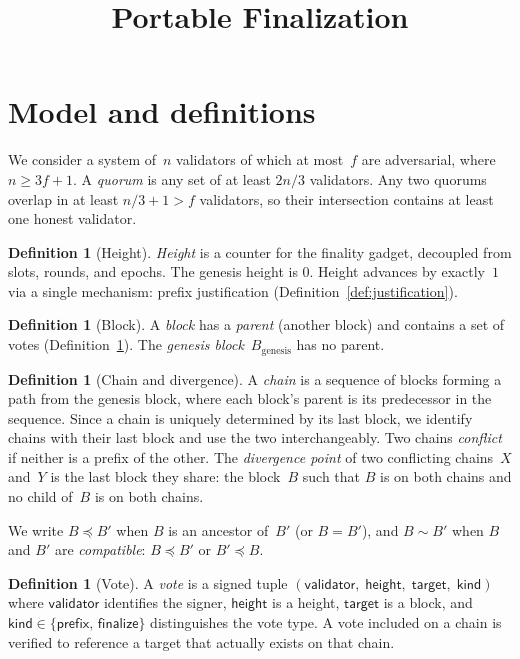 \documentclass{article}
\title{Portable Finalization}
\newcommand{\target}{\mathsf{target}}
\newcommand{\kind}{\mathsf{kind}}
\newcommand{\height}{\mathsf{height}}
\newcommand{\finalize}{\mathsf{finalize}}
\newcommand{\validator}{\mathsf{validator}}
\newcommand{\prefix}{\mathsf{prefix}}
\theoremstyle{plain}
\theoremstyle{definition}
\newtheorem{definition}[theorem]{Definition}
\theoremstyle{remark}
\begin{document}
\maketitle

\section{Model and definitions}

We consider a system of~$n$ validators of which at most~$f$ are adversarial, where $n \geq 3f + 1$.
A \emph{quorum} is any set of at least $2n/3$ validators.
Any two quorums overlap in at least $n/3 + 1 > f$ validators, so their intersection contains at least one honest validator.

\begin{definition}[Height]\label{def:height}
\emph{Height} is a counter for the finality gadget, decoupled from slots, rounds, and epochs.
The genesis height is $0$.
Height advances by exactly~$1$ via a single mechanism: prefix justification (Definition~\ref{def:justification}).
\end{definition}

\begin{definition}[Block]\label{def:block}
A \emph{block} has a \emph{parent} (another block) and contains a set of votes (Definition~\ref{def:vote}).
The \emph{genesis block}~$B_{\mathrm{genesis}}$ has no parent.
\end{definition}

\begin{definition}[Chain and divergence]\label{def:chain}
A \emph{chain} is a sequence of blocks forming a path from the genesis block, where each block's parent is its predecessor in the sequence.
Since a chain is uniquely determined by its last block, we identify chains with their last block and use the two interchangeably.
Two chains \emph{conflict} if neither is a prefix of the other.
The \emph{divergence point} of two conflicting chains~$X$ and~$Y$ is the last block they share: the block~$B$ such that $B$ is on both chains and no child of~$B$ is on both chains.
\end{definition}

We write $B \preceq B'$ when $B$ is an ancestor of~$B'$ (or $B = B'$), and $B \sim B'$ when $B$ and $B'$ are \emph{compatible}: $B \preceq B'$ or $B' \preceq B$.

\begin{definition}[Vote]\label{def:vote}
A \emph{vote} is a signed tuple $(\validator,\; \height,\; \target,\; \kind)$ where $\validator$ identifies the signer, $\height$ is a height, $\target$ is a block, and $\kind \in \{\prefix,\, \finalize\}$ distinguishes the vote type.
A vote included on a chain is verified to reference a target that actually exists on that chain.
\end{definition}
\end{document}
